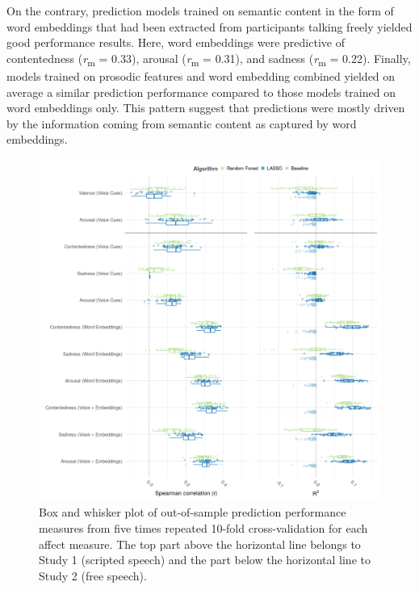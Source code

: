 \documentclass[
  english,
  man,floatsintext]{apa6}
\begin{document}
On the contrary, prediction models trained on semantic content in the form of word embeddings that had been extracted from participants talking freely yielded good performance results. Here, word embeddings were predictive of contentedness (\emph{r}\textsubscript{m} = 0.33), arousal (\emph{r}\textsubscript{m} = 0.31), and sadness (\emph{r}\textsubscript{m} = 0.22).
Finally, models trained on prosodic features and word embedding combined yielded on average a similar prediction performance compared to those models trained on word embeddings only. This pattern suggest that predictions were mostly driven by the information coming from semantic content as captured by word embeddings.
\newpage

\begin{figure}

{\centering \includegraphics[width=1\linewidth,height=1\textheight]{../figures/bmr_plot} 

}

\caption[Prediction performance]{Box and whisker plot of out-of-sample prediction performance measures from five times repeated 10-fold cross-validation for each affect measure. The top part above the horizontal line belongs to Study 1 (scripted speech) and the part below the horizontal line to Study 2 (free speech).}\label{fig:predictionoverview}
\end{figure}
\newpage
\end{document}
